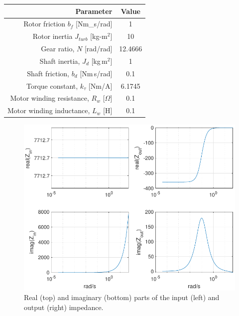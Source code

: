 \documentclass[lettersize,journal]{IEEEtran}
\begin{document}
{\begin{table}[tb]
\begin{tabular}{rc}
                \hline
                \textbf{Parameter} & \textbf{Value} \\
                \hline
                Rotor friction $b_f$ [Nm\_s/rad] & 1 \\
                Rotor inertia $J_{turb}$ [kg-m$^2$] & 10 \\
                Gear ratio, $N$ [rad/rad] & 12.4666 \\
                Shaft inertia, $J_d$ [kg\,m$^2$]                & 1 \\
                Shaft friction, $b_d$ [Nm\,s/rad]               & 0.1 \\
                Torque constant, $k_\tau$ [Nm/A]                & 6.1745 \\
                Motor winding resistance, $R_w$ [$\Omega$]      & 0.1 \\
                Motor winding inductance, $L_w$ [H]             & 0.1 \\
                \hline
                
                \hline
        \end{tabular}
\end{table}

\begin{figure}
        \centering \includegraphics[width=\columnwidth]{RotorZinZout.pdf}
        \caption{Real (top) and imaginary (bottom) parts of the input (left) and output (right) impedance.}
        \label{fig: RotorZinZout}
\end{figure}

}
\end{document}
